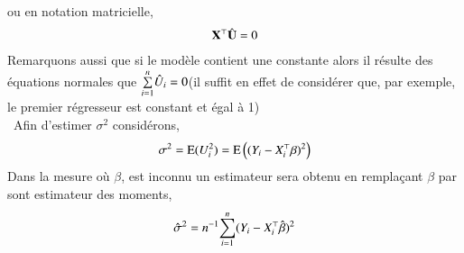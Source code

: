\documentclass[10pt, reqno]{amsart}
\begin{document}
ou en notation matricielle,
\begin{align}
\mathbf X^\top\hat{\mathbf U} = 0
\label{eq11}
\end{align}
Remarquons aussi que si le modèle contient une constante alors il résulte des équations normales que $\underset{i=1}{\overset{n}{\sum}}\hat{U}_i = 0$(il suffit en effet de considérer que, par exemple, le premier régresseur est constant et égal à 1)\\\
Afin d'estimer $\sigma^2$ considérons,
\begin{align*}
\sigma^2 = \operatorname{E}(U_i^2)=\operatorname{E}\left((Y_i - X_i^\top\beta)^2\right)
\end{align*}
Dans la mesure où $\beta$, est inconnu un estimateur  sera obtenu en remplaçant $\beta$ par sont estimateur des moments,
\begin{align}
\hat{\sigma}^2 = n^{-1}\underset{i=1}{\overset{n}{\sum}}(Y_i-X_i^\top\hat{\beta})^2
\label{eq12}
\end{align}
\end{document}
